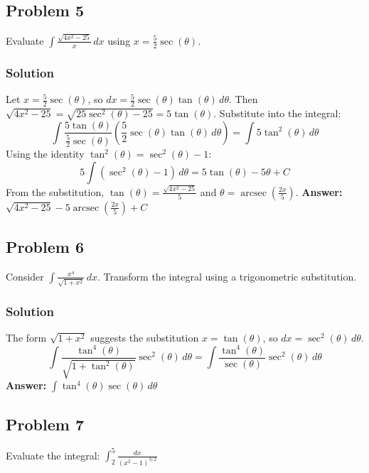 \documentclass{article}
\begin{document}
\subsection{Problem 5}
Evaluate $ \int \frac{\sqrt{4x^2 - 25}}{x} \,dx $ using $ x = \frac{5}{2} \sec(\theta) $.
\subsubsection*{Solution}
Let $ x = \frac{5}{2} \sec(\theta) $, so $ dx = \frac{5}{2} \sec(\theta)\tan(\theta) \,d\theta $.
Then $ \sqrt{4x^2 - 25} = \sqrt{25\sec^2(\theta) - 25} = 5\tan(\theta) $.
Substitute into the integral:
\[ \int \frac{5\tan(\theta)}{\frac{5}{2}\sec(\theta)} \left(\frac{5}{2}\sec(\theta)\tan(\theta) \,d\theta\right) = \int 5\tan^2(\theta) \,d\theta \]
Using the identity $ \tan^2(\theta) = \sec^2(\theta) - 1 $:
\[ 5 \int (\sec^2(\theta) - 1) \,d\theta = 5\tan(\theta) - 5\theta + C \]
From the substitution, $ \tan(\theta) = \frac{\sqrt{4x^2-25}}{5} $ and $ \theta = \operatorname{arcsec}(\frac{2x}{5}) $.
\textbf{Answer:} $ \sqrt{4x^2 - 25} - 5 \operatorname{arcsec}\left(\frac{2x}{5}\right) + C $
 

\subsection{Problem 6}
Consider $ \int \frac{x^4}{\sqrt{1 + x^2}} \,dx $. Transform the integral using a trigonometric substitution.
\subsubsection*{Solution}
The form $ \sqrt{1 + x^2} $ suggests the substitution $ x = \tan(\theta) $, so $ dx = \sec^2(\theta) \,d\theta $.
\[ \int \frac{\tan^4(\theta)}{\sqrt{1 + \tan^2(\theta)}} \sec^2(\theta) \,d\theta = \int \frac{\tan^4(\theta)}{\sec(\theta)} \sec^2(\theta) \,d\theta \]
\textbf{Answer:} $ \int \tan^4(\theta)\sec(\theta) \,d\theta $
 

\subsection{Problem 7}
Evaluate the integral: $ \int_{2}^{5} \frac{dx}{(x^2 - 1)^{3/2}} $
\end{document}
